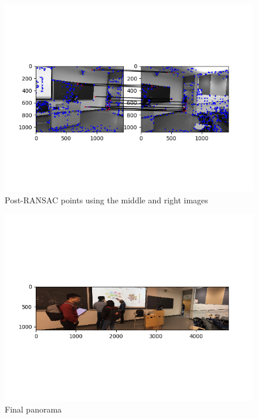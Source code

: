 \documentclass[10pt]{article}
\begin{document}
		\begin{figure}[h]
			\caption{Post-RANSAC points using the middle and right images}
			\centering
			\includegraphics{img/postranMR.png}
		\end{figure}
		

		\begin{figure}[h]
			\caption{Final panorama}
			\centering
			\includegraphics{img/mosaic.png}
		\end{figure}
\end{document}
